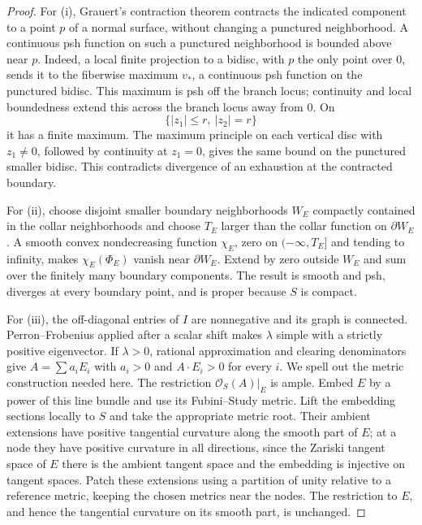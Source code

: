 \documentclass[11pt]{amsart}
\theoremstyle{definition}
\theoremstyle{remark}
\numberwithin{equation}{section}
\newcommand{\OO}{\mathcal O}
\begin{document}
\begin{proof}
For \textup{(i)}, Grauert's contraction theorem \cite{Grauert1962}
contracts the indicated component to a point $p$ of a normal surface,
without changing a punctured neighborhood. A continuous psh function
on such a punctured neighborhood is bounded above near $p$. Indeed,
a local finite projection to a bidisc, with $p$ the only point over
$0$, sends it to the fiberwise maximum $v_*$, a continuous psh function
on the punctured bidisc. This maximum is psh off the branch locus;
continuity and local boundedness extend this across the branch locus
away from $0$. On
\[
 \{|z_1|\le r,\ |z_2|=r\}
\]
it has a finite maximum. The maximum principle on each vertical disc
with $z_1\ne0$, followed by continuity at $z_1=0$, gives the same bound
on the punctured smaller bidisc. This contradicts divergence of an
exhaustion at the contracted boundary.

For \textup{(ii)}, choose disjoint smaller boundary neighborhoods $W_E$
compactly contained in the collar neighborhoods and choose $T_E$ larger
than the collar function on $\partial W_E$. A smooth convex
nondecreasing function $\chi_E$, zero on $(-\infty,T_E]$ and tending to
infinity, makes $\chi_E(\Phi_E)$ vanish near $\partial W_E$. Extend by
zero outside $W_E$ and sum over the finitely many boundary components.
The result is smooth and psh, diverges at every boundary point, and is
proper because $S$ is compact.

For \textup{(iii)}, the off-diagonal entries of $I$ are nonnegative and
its graph is connected. Perron--Frobenius applied after a scalar shift
makes $\lambda$ simple with a strictly positive eigenvector. If
$\lambda>0$, rational approximation and clearing denominators give
$A=\sum a_iE_i$ with $a_i>0$ and $A\cdot E_i>0$ for every $i$.
We spell out the metric construction needed here. The restriction
$\OO_S(A)|_E$ is ample. Embed $E$ by a power of this line bundle and
use its Fubini--Study metric. Lift the embedding sections locally to
$S$ and take the appropriate metric root. Their ambient extensions
have positive tangential curvature along the smooth part of $E$;
at a node they have positive curvature in all directions, since the
Zariski tangent space of $E$ there is the ambient tangent space and
the embedding is injective on tangent spaces. Patch these extensions
using a partition of unity relative to a reference metric, keeping
the chosen metrics near the nodes. The restriction to $E$, and hence
the tangential curvature on its smooth part, is unchanged.


\end{proof}
\end{document}
